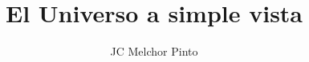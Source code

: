\documentclass[12pt,addpoints,answers]{guia}
\title{El Universo a simple vista}
\author{JC Melchor Pinto}
\begin{document}
\INFO%
\begin{questions}
    \questionboxed[25]{}
    \questionboxed[25]{}
\end{questions}
\end{document}
